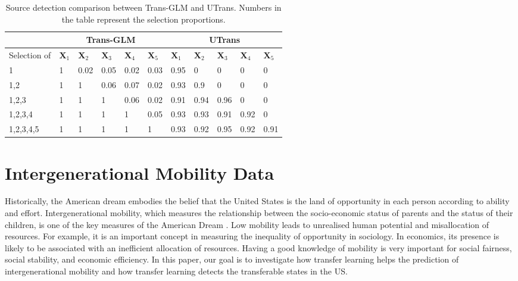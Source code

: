 \documentclass[twoside,12pt]{article}
\newcommand{\mb}[1]{\boldsymbol{\mathbf{#1}}}
\begin{document}
\begin{table}[hbt!]
\caption{Source detection comparison between Trans-GLM and UTrans. Numbers in the table represent the selection proportions.}
\centering
\label{tb: selection}
\begin{tabular}{|l|lllll|lllll|}

\hline
& \multicolumn{5}{c|}{Trans-GLM} & \multicolumn{5}{c|}{UTrans}\\ \hline
\multicolumn{1}{|l|}{Selection of}     & {$\mb X_1$} & {$\mb X_2$} & {$\mb X_3$} & {$\mb X_4$} & {$\mb X_5$} & {$\mb X_1$} & {$\mb X_2$} & {$\mb X_3$} & {$\mb X_4$} & $\mb X_5$ \\ \hline
\multicolumn{1}{|l|}{1} & 1 &0.02&0.05&0.02&0.03&0.95&0&0&0&0 \\ \hline
\multicolumn{1}{|l|}{1,2} & 1&1&0.06&0.07&0.02&0.93&0.9&0&0&0  \\ \hline
\multicolumn{1}{|l|}{1,2,3}     &1&1&1&0.06&0.02&0.91&0.94&0.96&0&0\\ \hline
\multicolumn{1}{|l|}{1,2,3,4}   & 1&1&1&1&0.05&0.93&0.93&0.91&0.92&0 \\ \hline
\multicolumn{1}{|l|}{1,2,3,4,5} &1&1&1&1&1&0.93&0.92&0.95&0.92&0.91\\ \hline
\end{tabular}
\end{table}

\section{Intergenerational Mobility Data}
\label{sec: app}

Historically, the American dream embodies the belief that the United States is the land of opportunity in each person according to ability and effort. 
Intergenerational mobility, which measures the relationship between the socio-economic status of parents and the status of their children, is one of the key measures of the American Dream \citep{van2021intergenerational}.
Low mobility leads to unrealised human potential and misallocation of resources.
For example, it is an important concept in measuring the inequality of opportunity in sociology.
In economics, its presence is likely to be associated with an inefficient allocation of resources. 
Having a good knowledge of mobility is very important for social fairness, social stability, and economic efficiency.
In this paper, our goal is to investigate how transfer learning helps the  prediction of intergenerational mobility and how transfer learning detects the transferable states in the US.
\end{document}

